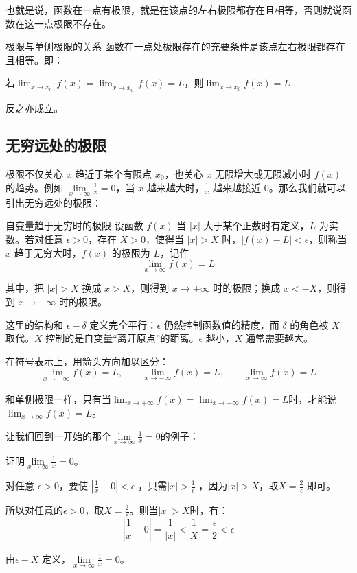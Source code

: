 也就是说，函数在一点有极限，就是在该点的左右极限都存在且相等，否则就说函数在这一点极限不存在。

\begin{theorem}{极限与单侧极限的关系}{}
函数在一点处极限存在的充要条件是该点左右极限都存在且相等。即：

  \begin{center}
    若\(\lim_{x \to x_0^-} f(x) = \lim_{x \to x_0^+} f(x) = L\)，则\(\lim_{x \to x_0} f(x) = L\)
  \end{center}

  反之亦成立。

\end{theorem}

\subsection{无穷远处的极限}

极限不仅关心 $x$ 趋近于某个有限点 $x_0$，也关心 $x$ 无限增大或无限减小时 $f(x)$ 的趋势。例如 $\lim\limits_{x \to \infty} \frac{1}{x} = 0$，当 $x$ 越来越大时，$\frac{1}{x}$ 越来越接近 $0$。那么我们就可以引出无穷远处的极限：

\begin{definition}{自变量趋于无穷时的极限}{}
设函数 $f(x)$ 当 $|x|$ 大于某个正数时有定义，$L$ 为实数。若对任意 $\epsilon > 0$，存在 $X > 0$，使得当 $|x| > X$ 时，$|f(x) - L| < \epsilon$，则称当 $x$ 趋于无穷大时，$f(x)$ 的极限为 $L$，记作
\[
\lim_{x \to \infty} f(x) = L
\]

其中，把 $|x| > X$ 换成 $x > X$，则得到 $x \to +\infty$ 时的极限；换成 $x < -X$，则得到 $x \to -\infty$ 时的极限。
\end{definition}

这里的结构和 $\epsilon-\delta$ 定义完全平行：$\epsilon$ 仍然控制函数值的精度，而 $\delta$ 的角色被 $X$ 取代。$X$ 控制的是自变量“离开原点”的距离。$\epsilon$ 越小，$X$ 通常需要越大。

在符号表示上，用箭头方向加以区分：
\[
\lim_{x \to +\infty} f(x) = L, \qquad \lim_{x \to -\infty} f(x) = L, \qquad \lim_{x \to \infty} f(x) = L
\]

和单侧极限一样，只有当\(\lim_{x \to +\infty} f(x) = \lim_{x \to -\infty} f(x) = L\)时，才能说\(\lim_{x \to \infty} f(x) = L\)。

让我们回到一开始的那个$\lim\limits_{x \to \infty} \frac{1}{x} = 0$的例子：

\begin{myexample}
  证明$\lim\limits_{x \to \infty} \frac{1}{x} = 0$。

  对任意 $ \epsilon>0$，要使 $| \frac {1}{x} -0|< \epsilon $ ，只需$|x|> \frac {1}{\epsilon } $ ，因为$|x| > X$，取$X= \frac {2}{\epsilon } $ 即可。

  所以对任意的$\epsilon >0$，取$ X= \frac {2}{\epsilon }$。则当$|x|>X$时，有：
  \[|\frac{1}{x}-0|=\frac{1}{|x|}<\frac{1}{X}=\frac {\epsilon }{2}<\epsilon \]

  由$\epsilon-X$ 定义，$\lim\limits_{x \to \infty} \frac{1}{x} = 0$。
\end{myexample}

